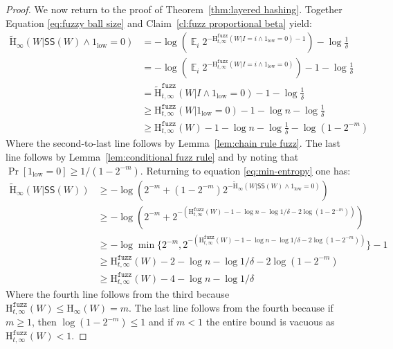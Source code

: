 \documentclass[11pt]{article}
\newcommand{\thref}[1]{\mbox{Theorem~\ref{#1}}}
\newcommand{\lemref}[1]{\mbox{Lemma~\ref{#1}}}
\newcommand{\clref}[1]{\mbox{Claim~\ref{#1}}}
\DeclareMathOperator*{\expe}{\mathbb{E}}
\newcommand{\class}[1]{{\ensuremath{\mathsf{#1}}}}
\newcommand{\sketch}{\ensuremath{\class{SS}}\xspace}
\newcommand{\Hoo}{\mathrm{H}_\infty}
\newcommand{\Hav}{\tilde{\mathrm{H}}_\infty}
\newcommand{\Hfuzz}{\mathrm{H}^{\mathtt{fuzz}}_{t,\infty}}
\newcommand{\Hfav}{\tilde{\mathrm{H}}^{\mathtt{fuzz}}_{t,\infty}}
\begin{document}
\begin{proof}
\noindent 
We now return to the proof of \thref{thm:layered hashing}. Together Equation \ref{eq:fuzzy ball size} and \clref{cl:fuzz proportional beta} yield:
\begin{align*}
\Hav(W | \sketch(W) \wedge 1_{\text{low}} =0) &=-\log \left( \expe_{i} 2^{-\Hfuzz(W | I=i \wedge 1_{\text{low}}=0)-1}\right) -\log \frac{1}{\delta} \\
&=-\log \left( \expe_{i} 2^{-\Hfuzz(W | I=i \wedge 1_{\text{low}} =0)}\right) -1- \log \frac{1}{\delta} \\
&=\Hfav(W | I \wedge 1_{\text{low}}=0)-1- \log \frac{1}{\delta} \\
&\ge\Hfuzz(W | 1_{\text{low}}=0)-1-\log n -\log \frac{1}{\delta}\\
&\ge\Hfuzz(W)-1-\log n -\log \frac{1}{\delta} - \log (1-2^{-m})
\end{align*}
Where the second-to-last line follows by \lemref{lem:chain rule fuzz}.  The last line follows by \lemref{lem:conditional fuzz rule} and by noting that $\Pr[1_{\text{low}}=0] \ge 1/(1-2^{-m})$.
Returning to equation \ref{eq:min-entropy} one has:
\begin{align*}
\Hav(W | \sketch(W)) &\ge -\log\left( 2^{-m} + (1-2^{-m}) 2^{-\Hav(W | \sketch(W) \wedge 1_{\text{low}} = 0)}\label{eq:min-entropy}\right)\\
&\ge -\log \left(2^{-m}+2^{-(\Hfuzz(W) -1 - \log n  -\log 1/\delta-2\log (1-2^{-m}) )}\right)\\
&\ge -\log \min\{2^{-m}, 2^{-(\Hfuzz(W) -1 - \log n  -\log 1/\delta-2\log (1-2^{-m}) )}\}-1\\
&\ge \Hfuzz(W) - 2- \log n - \log 1/\delta  -2\log (1-2^{-m}) \\
&\ge \Hfuzz(W) - 4- \log n - \log 1/\delta
\end{align*}
Where the fourth line follows from the third because $\Hfuzz(W)\le \Hoo(W) = m$. The last line follows from the fourth because if $m\ge 1$, then $\log (1-2^{-m}) \le 1$ and if $m<1$ the entire bound is vacuous as $\Hfuzz(W) < 1$.
\end{proof}
\end{document}
